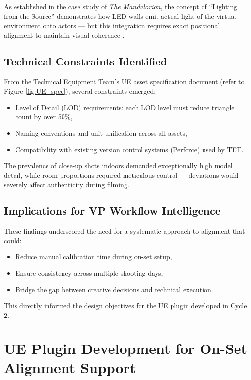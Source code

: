 \documentclass[12pt,a4paper]{report}
\begin{document}
As established in the case study of \textit{The Mandalorian}, the concept of ``Lighting from the Source'' demonstrates how LED walls emit actual light of the virtual environment onto actors — but this integration requires exact positional alignment to maintain visual coherence \cite{b8}.

\subsection{Technical Constraints Identified}
From the Technical Equipment Team's UE asset specification document (refer to Figure \ref{fig:UE_spec}), several constraints emerged:
\begin{itemize}
    \item Level of Detail (LOD) requirements: each LOD level must reduce triangle count by over 50\%,
    \item Naming conventions and unit unification across all assets,
    \item Compatibility with existing version control systems (Perforce) used by TET.
\end{itemize}

The prevalence of close-up shots indoors demanded exceptionally high model detail, while room proportions required meticulous control — deviations would severely affect authenticity during filming.

\subsection{Implications for VP Workflow Intelligence}
These findings underscored the need for a systematic approach to alignment that could:
\begin{itemize}
    \item Reduce manual calibration time during on-set setup,
    \item Ensure consistency across multiple shooting days,
    \item Bridge the gap between creative decisions and technical execution.
\end{itemize}
This directly informed the design objectives for the UE plugin developed in Cycle 2.


\section{UE Plugin Development for On-Set Alignment Support}
\end{document}
